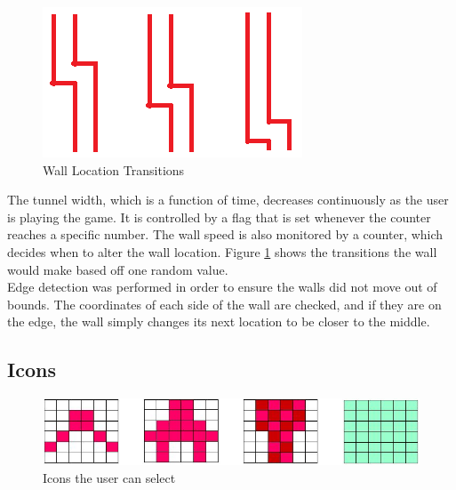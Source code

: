 \documentclass[11pt]{article}
\begin{document}
	\begin{figure}[h]\centering
	\includegraphics[height=0.3\textwidth]{Images/wall.png}
	\caption{Wall Location Transitions}
		\label{wall}
	\end{figure}

\hspace{12pt} The tunnel width, which is a function of time, decreases continuously as the user is playing the game. 
It is controlled by a flag that is set whenever the counter reaches a specific number. The wall speed is also monitored by a counter, which decides when to alter the wall location.  Figure \ref{wall} shows the transitions the wall would make based off one random value. \\

\hspace{12pt} Edge detection was performed in order to ensure the walls did not move out of bounds.  The coordinates of each side of the wall are checked, and if they are on the edge, the wall simply changes its next location to be closer to the middle.  \\
	
\subsection{Icons}

		\begin{figure}[h]\centering
		  \includegraphics[width=.7\textwidth]{Images/icons.png}
		  \caption{Icons the user can select}
		  \label{icons}
		\end{figure}	
\end{document}
